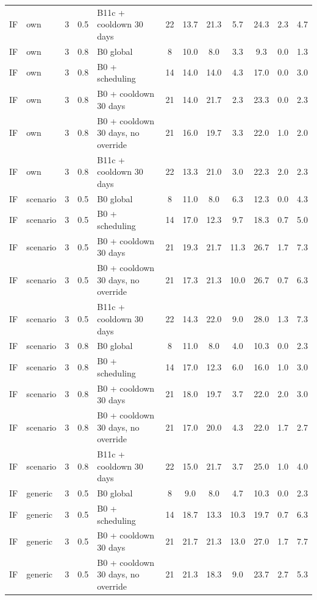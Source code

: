 \begin{longtable}{lllllccccccc}
IF & own & 3 & 0.5 & B11c + cooldown 30 days & 22 & 13.7 & 21.3 & 5.7 & 24.3 & 2.3 & 4.7 \\
IF & own & 3 & 0.8 & B0 global & 8 & 10.0 & 8.0 & 3.3 & 9.3 & 0.0 & 1.3 \\
IF & own & 3 & 0.8 & B0 + scheduling & 14 & 14.0 & 14.0 & 4.3 & 17.0 & 0.0 & 3.0 \\
IF & own & 3 & 0.8 & B0 + cooldown 30 days & 21 & 14.0 & 21.7 & 2.3 & 23.3 & 0.0 & 2.3 \\
IF & own & 3 & 0.8 & B0 + cooldown 30 days, no override & 21 & 16.0 & 19.7 & 3.3 & 22.0 & 1.0 & 2.0 \\
IF & own & 3 & 0.8 & B11c + cooldown 30 days & 22 & 13.3 & 21.0 & 3.0 & 22.3 & 2.0 & 2.3 \\
IF & scenario & 3 & 0.5 & B0 global & 8 & 11.0 & 8.0 & 6.3 & 12.3 & 0.0 & 4.3 \\
IF & scenario & 3 & 0.5 & B0 + scheduling & 14 & 17.0 & 12.3 & 9.7 & 18.3 & 0.7 & 5.0 \\
IF & scenario & 3 & 0.5 & B0 + cooldown 30 days & 21 & 19.3 & 21.7 & 11.3 & 26.7 & 1.7 & 7.3 \\
IF & scenario & 3 & 0.5 & B0 + cooldown 30 days, no override & 21 & 17.3 & 21.3 & 10.0 & 26.7 & 0.7 & 6.3 \\
IF & scenario & 3 & 0.5 & B11c + cooldown 30 days & 22 & 14.3 & 22.0 & 9.0 & 28.0 & 1.3 & 7.3 \\
IF & scenario & 3 & 0.8 & B0 global & 8 & 11.0 & 8.0 & 4.0 & 10.3 & 0.0 & 2.3 \\
IF & scenario & 3 & 0.8 & B0 + scheduling & 14 & 17.0 & 12.3 & 6.0 & 16.0 & 1.0 & 3.0 \\
IF & scenario & 3 & 0.8 & B0 + cooldown 30 days & 21 & 18.0 & 19.7 & 3.7 & 22.0 & 2.0 & 3.0 \\
IF & scenario & 3 & 0.8 & B0 + cooldown 30 days, no override & 21 & 17.0 & 20.0 & 4.3 & 22.0 & 1.7 & 2.7 \\
IF & scenario & 3 & 0.8 & B11c + cooldown 30 days & 22 & 15.0 & 21.7 & 3.7 & 25.0 & 1.0 & 4.0 \\
IF & generic & 3 & 0.5 & B0 global & 8 & 9.0 & 8.0 & 4.7 & 10.3 & 0.0 & 2.3 \\
IF & generic & 3 & 0.5 & B0 + scheduling & 14 & 18.7 & 13.3 & 10.3 & 19.7 & 0.7 & 6.3 \\
IF & generic & 3 & 0.5 & B0 + cooldown 30 days & 21 & 21.7 & 21.3 & 13.0 & 27.0 & 1.7 & 7.7 \\
IF & generic & 3 & 0.5 & B0 + cooldown 30 days, no override & 21 & 21.3 & 18.3 & 9.0 & 23.7 & 2.7 & 5.3 \\

\end{longtable}
